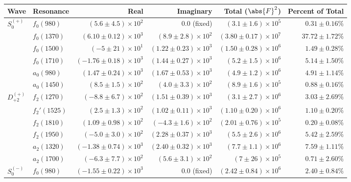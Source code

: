 \begin{table}[ht]
    \begin{center}
        \begin{tabular}{llrrrr}\toprule
        Wave & Resonance & Real & Imaginary & Total ($\abs{F}^2$) & Percent of Total \\\midrule
$S_{0}^{(+)}$ & $f_{0}(980)$ & $(5.6 \pm 4.5) \times 10^{2}$ & $0.0$ (fixed) & $(3.1 \pm 1.6) \times 10^{5}$ & $0.31 \pm 0.16 \%$ \\
 & $f_{0}(1370)$ & $(6.10 \pm 0.12) \times 10^{3}$ & $(8.9 \pm 2.8) \times 10^{2}$ & $(3.80 \pm 0.17) \times 10^{7}$ & $37.72 \pm 1.72 \%$ \\
 & $f_{0}(1500)$ & $(-5 \pm 21) \times 10^{1}$ & $(1.22 \pm 0.23) \times 10^{3}$ & $(1.50 \pm 0.28) \times 10^{6}$ & $1.49 \pm 0.28 \%$ \\
 & $f_{0}(1710)$ & $(-1.76 \pm 0.18) \times 10^{3}$ & $(1.44 \pm 0.27) \times 10^{3}$ & $(5.2 \pm 1.5) \times 10^{6}$ & $5.14 \pm 1.50 \%$ \\
 & $a_{0}(980)$ & $(1.47 \pm 0.24) \times 10^{3}$ & $(1.67 \pm 0.53) \times 10^{3}$ & $(4.9 \pm 1.2) \times 10^{6}$ & $4.91 \pm 1.14 \%$ \\
 & $a_{0}(1450)$ & $(8.5 \pm 1.5) \times 10^{2}$ & $(4.0 \pm 3.3) \times 10^{2}$ & $(8.9 \pm 1.6) \times 10^{5}$ & $0.88 \pm 0.16 \%$ \\
$D_{+2}^{(+)}$ & $f_{2}(1270)$ & $(-8.8 \pm 6.7) \times 10^{2}$ & $(1.51 \pm 0.39) \times 10^{3}$ & $(3.1 \pm 2.7) \times 10^{6}$ & $3.03 \pm 2.69 \%$ \\
 & $f_{2}'(1525)$ & $(2.5 \pm 1.3) \times 10^{2}$ & $(1.02 \pm 0.11) \times 10^{3}$ & $(1.10 \pm 0.20) \times 10^{6}$ & $1.10 \pm 0.20 \%$ \\
 & $f_{2}(1810)$ & $(1.09 \pm 0.98) \times 10^{2}$ & $(-4.3 \pm 1.6) \times 10^{2}$ & $(2.01 \pm 0.76) \times 10^{5}$ & $0.20 \pm 0.08 \%$ \\
 & $f_{2}(1950)$ & $(-5.0 \pm 3.0) \times 10^{2}$ & $(2.28 \pm 0.37) \times 10^{3}$ & $(5.5 \pm 2.6) \times 10^{6}$ & $5.42 \pm 2.59 \%$ \\
 & $a_{2}(1320)$ & $(-1.38 \pm 0.74) \times 10^{3}$ & $(2.40 \pm 0.32) \times 10^{3}$ & $(7.7 \pm 1.1) \times 10^{6}$ & $7.59 \pm 1.11 \%$ \\
 & $a_{2}(1700)$ & $(-6.3 \pm 7.7) \times 10^{2}$ & $(5.6 \pm 3.1) \times 10^{2}$ & $(7 \pm 26) \times 10^{5}$ & $0.71 \pm 2.60 \%$ \\
$S_{0}^{(-)}$ & $f_{0}(980)$ & $(-1.55 \pm 0.22) \times 10^{3}$ & $0.0$ (fixed) & $(2.42 \pm 0.84) \times 10^{6}$ & $2.40 \pm 0.84 \%$ \\

\end{tabular}
\end{center}
\end{table}

